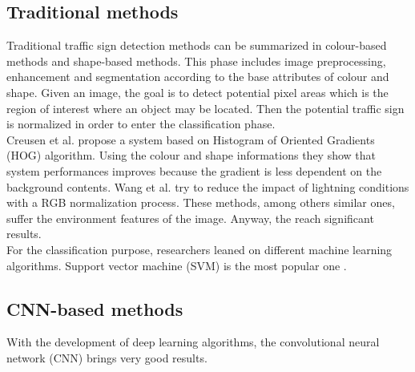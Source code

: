 \subsection{Traditional methods}
Traditional traffic sign detection methods can be summarized in colour-based methods and shape-based methods. This phase includes image preprocessing, enhancement and segmentation according to the base attributes of colour and shape. Given an image, the goal is to detect potential pixel areas which is the region of interest where an object may be located. Then the potential traffic sign is normalized in order to enter the classification phase.\\
Creusen et al. \cite{CreusenHog} propose a system based on Histogram of Oriented Gradients (HOG) algorithm. Using the colour and shape informations they show that system performances improves because the gradient is less dependent on the background contents. Wang et al. \cite{WangRGB} try to reduce the impact of lightning conditions with a RGB normalization process. These methods, among others similar ones, suffer the environment features of the image. Anyway, the reach significant results.\\
For the classification purpose, researchers leaned on different machine learning algorithms. Support vector machine (SVM) is the most popular one \cite{greenSVM}.

\subsection{CNN-based methods}
With the development of deep learning algorithms, the convolutional neural network (CNN) brings very good results.


